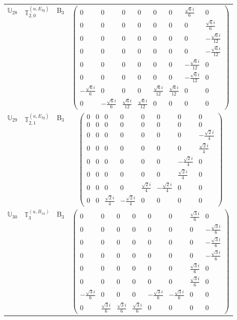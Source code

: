 \documentclass[fleqn,10pt,landscape]{article}
\begin{document}
\begin{itemize}
\begin{center}
\begin{longtable}{c|c|c|c}
$ \mathbb{U}_{28} $ & $\mathbb{T}_{2,0}^{(u,E_{2g})}$ & B$_{3}$ & $\begin{pmatrix} 0 & 0 & 0 & 0 & 0 & 0 & \frac{\sqrt{6} i}{6} & 0 \\ 0 & 0 & 0 & 0 & 0 & 0 & 0 & \frac{\sqrt{6} i}{6} \\ 0 & 0 & 0 & 0 & 0 & 0 & 0 & - \frac{\sqrt{6} i}{12} \\ 0 & 0 & 0 & 0 & 0 & 0 & 0 & - \frac{\sqrt{6} i}{12} \\ 0 & 0 & 0 & 0 & 0 & 0 & - \frac{\sqrt{6} i}{12} & 0 \\ 0 & 0 & 0 & 0 & 0 & 0 & - \frac{\sqrt{6} i}{12} & 0 \\ - \frac{\sqrt{6} i}{6} & 0 & 0 & 0 & \frac{\sqrt{6} i}{12} & \frac{\sqrt{6} i}{12} & 0 & 0 \\ 0 & - \frac{\sqrt{6} i}{6} & \frac{\sqrt{6} i}{12} & \frac{\sqrt{6} i}{12} & 0 & 0 & 0 & 0 \end{pmatrix}$ \\
$ \mathbb{U}_{29} $ & $\mathbb{T}_{2,1}^{(u,E_{2g})}$ & B$_{3}$ & $\begin{pmatrix} 0 & 0 & 0 & 0 & 0 & 0 & 0 & 0 \\ 0 & 0 & 0 & 0 & 0 & 0 & 0 & 0 \\ 0 & 0 & 0 & 0 & 0 & 0 & 0 & - \frac{\sqrt{2} i}{4} \\ 0 & 0 & 0 & 0 & 0 & 0 & 0 & \frac{\sqrt{2} i}{4} \\ 0 & 0 & 0 & 0 & 0 & 0 & - \frac{\sqrt{2} i}{4} & 0 \\ 0 & 0 & 0 & 0 & 0 & 0 & \frac{\sqrt{2} i}{4} & 0 \\ 0 & 0 & 0 & 0 & \frac{\sqrt{2} i}{4} & - \frac{\sqrt{2} i}{4} & 0 & 0 \\ 0 & 0 & \frac{\sqrt{2} i}{4} & - \frac{\sqrt{2} i}{4} & 0 & 0 & 0 & 0 \end{pmatrix}$ \\
$ \mathbb{U}_{30} $ & $\mathbb{T}_{3}^{(u,B_{1u})}$ & B$_{3}$ & $\begin{pmatrix} 0 & 0 & 0 & 0 & 0 & 0 & \frac{\sqrt{3} i}{6} & 0 \\ 0 & 0 & 0 & 0 & 0 & 0 & 0 & - \frac{\sqrt{3} i}{6} \\ 0 & 0 & 0 & 0 & 0 & 0 & 0 & - \frac{\sqrt{3} i}{6} \\ 0 & 0 & 0 & 0 & 0 & 0 & 0 & - \frac{\sqrt{3} i}{6} \\ 0 & 0 & 0 & 0 & 0 & 0 & \frac{\sqrt{3} i}{6} & 0 \\ 0 & 0 & 0 & 0 & 0 & 0 & \frac{\sqrt{3} i}{6} & 0 \\ - \frac{\sqrt{3} i}{6} & 0 & 0 & 0 & - \frac{\sqrt{3} i}{6} & - \frac{\sqrt{3} i}{6} & 0 & 0 \\ 0 & \frac{\sqrt{3} i}{6} & \frac{\sqrt{3} i}{6} & \frac{\sqrt{3} i}{6} & 0 & 0 & 0 & 0 \end{pmatrix}$ \\

\end{longtable}
\end{center}
\end{itemize}
\end{document}
